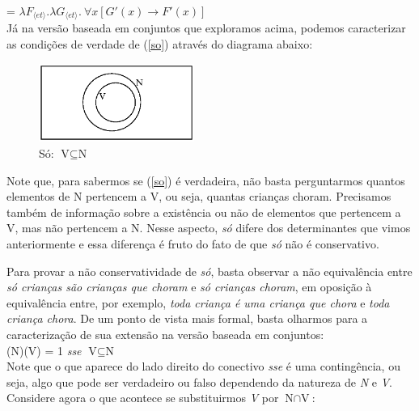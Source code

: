 \n {} = $\lambda F_{\langle et\rangle}.\lambda G_{\langle
et\rangle}.\ \forall x [G'(x)\rightarrow F'(x)]$\\

\n Já na versão baseada em conjuntos que exploramos acima, podemos
caracterizar as condições de verdade de (\ref{so}) através do
diagrama abaixo:

\begin{figure}[H]
\centerline{\includegraphics[width=12pc]{figures/so.eps}} \caption{Só:
$\text{V}\subseteq\text{N}$}
\end{figure}

\n Note que, para sabermos se (\ref{so}) é verdadeira, não basta
perguntarmos quantos elementos de N pertencem a V, ou seja, quantas crianças choram. Precisamos
também de informação sobre a existência ou não de elementos que
pertencem a V, mas não pertencem a N. Nesse aspecto, \textit{só}
difere dos determinantes que vimos anteriormente e essa diferença
é fruto do fato de que \textit{só} não é conservativo. 

Para provar a não conservatividade de \textit{só}, basta observar a não equivalência entre \textit{só crianças são crianças que choram} e \textit{só crianças choram}, em oposição à equivalência entre, por exemplo, \textit{toda criança é uma criança que chora} e \textit{toda criança chora}. De um ponto de vista mais formal, basta olharmos para
a caracterização de sua extensão na versão baseada em conjuntos:\\

\n {}(N)(V) = 1 \textit{sse} $\text{V}\subseteq\text{N}$\\

\n Note que o que aparece do lado direito do conectivo
\textit{sse} é uma contingência, ou seja, algo que pode ser
verdadeiro ou falso dependendo da natureza de \textit{N} e
\textit{V}. Considere agora o que acontece se substituirmos
\textit{V} por
$\text{N}\cap\text{V}$:\\

